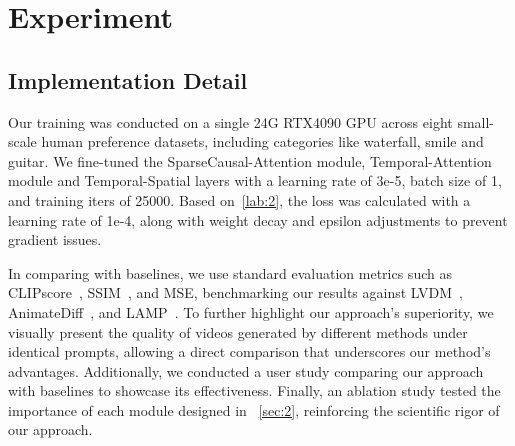 \section{Experiment}


\subsection{Implementation Detail}

Our training was conducted on a single 24G RTX4090 GPU across eight small-scale human preference datasets, including categories like waterfall, smile and guitar. We fine-tuned the SparseCausal-Attention module, Temporal-Attention module and Temporal-Spatial layers with a learning rate of 3e-5, batch size of 1, and training iters of 25000. Based on~\cref{lab:2}, the loss was calculated with a learning rate of 1e-4, along with weight decay and epsilon adjustments to prevent gradient issues. 

In comparing with baselines, we use standard evaluation metrics such as CLIPscore~\cite{radford2021learning}, SSIM~\cite{wang2004image}, and MSE, benchmarking our results against LVDM~\cite{he2022latent}, AnimateDiff~\cite{guo2023animatediff}, and LAMP~\cite{wu2023lamp}. To further highlight our approach's superiority, we visually present the quality of videos generated by different methods under identical prompts, allowing a direct comparison that underscores our method’s advantages. Additionally, we conducted a user study comparing our approach with baselines to showcase its effectiveness. Finally, an ablation study tested the importance of each module designed in ~\cref{sec:2}, reinforcing the scientific rigor of our approach.





